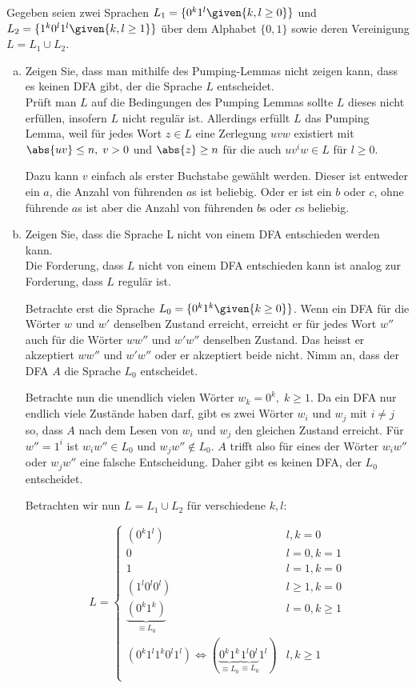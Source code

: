 Gegeben seien zwei Sprachen $L_1 = \{
0^{k}
 1^{l}
\given{k,l
\geq 0}\}$
und
$L_2 = \{1^k 0^l 1^l
\given{k,l \geq 1} \}$ über dem
 Alphabet $\{0, 1\}$
  sowie deren Vereinigung
  $L =
  L_1
  \cup
  L_2$.
\begin{enumerate}[a)]

\item Zeigen Sie, dass man mithilfe des Pumping-Lemmas nicht zeigen kann, dass es keinen DFA gibt, der die Sprache $L$ entscheidet.\\

Prüft man $L$ auf die Bedingungen des Pumping Lemmas sollte $L$ dieses nicht erfüllen, insofern $L$ nicht regulär ist. Allerdings erfüllt $L$ das Pumping Lemma, weil für jedes Wort $z \in L$ eine Zerlegung $uvw$ existiert mit $\abs{uv} \leq n, \; v>0$ und $\abs{z} \geq n$ für die auch $uv^iw \in L$ für $l \geq 0$.

Dazu kann $v$ einfach als erster Buchstabe gewählt werden. Dieser ist entweder ein $a$, die Anzahl von führenden $a$s ist beliebig. Oder er ist ein $b$ oder $c$, ohne führende $a$s ist aber die Anzahl von führenden $b$s oder $c$s beliebig.




\item Zeigen Sie, dass die Sprache L nicht von einem DFA entschieden werden kann.\\

Die Forderung, dass $L$ nicht von einem DFA entschieden kann ist analog zur Forderung, dass $L$ regulär ist.

Betrachte erst die Sprache $L_0 = \{  0^k 1^k \given{k \geq 0} \}$. Wenn ein DFA für die Wörter $w$ und $w'$ denselben Zustand erreicht, erreicht er für jedes Wort $w''$ auch für die Wörter $ww''$ und $w'w''$ denselben Zustand. Das heisst er akzeptiert $ww''$ und $w'w''$ oder er akzeptiert beide nicht. Nimm an, dass der DFA $A$ die Sprache $L_0$ entscheidet.

Betrachte nun die unendlich vielen Wörter $w_k = 0^k, \; k \geq 1$. Da ein DFA nur endlich viele Zustände haben darf, gibt es zwei Wörter $w_i$ und $w_j$ mit $i \neq j$ so, dass $A$ nach dem Lesen von $w_i$ und $w_j$ den gleichen Zustand erreicht. Für $w'' = 1^i$ ist $w_i w'' \in L_0$ und $w_j w'' \notin L_0$. $A$ trifft also für eines der Wörter $w_i w''$ oder $w_j w''$ eine falsche Entscheidung. Daher gibt es keinen DFA, der $L_0$ entscheidet.

Betrachten wir nun $L = L_1 \cup L_2$ für verschiedene $k, l$:

\[ L=
\begin{cases}
(0^k 1^l) & l,k = 0 \\
            0 & l = 0, k=1 \\
            1 & l = 1, k=0 \\
(1^l 0^l 0^l) & l \geq 1, k=0 \\
    \underbrace{(0^k 1^k)}_{\equiv L_0} & l=0, k \geq 1 \\
(0^k 1^l 1^k 0^l 1^l) \iff (\underbrace{0^k 1^k}_{\equiv L_0} \underbrace{1^l 0^l}_{\equiv L_0} 1^l) & l,k \geq 1 \\
\end{cases}
\]


\end{enumerate}
